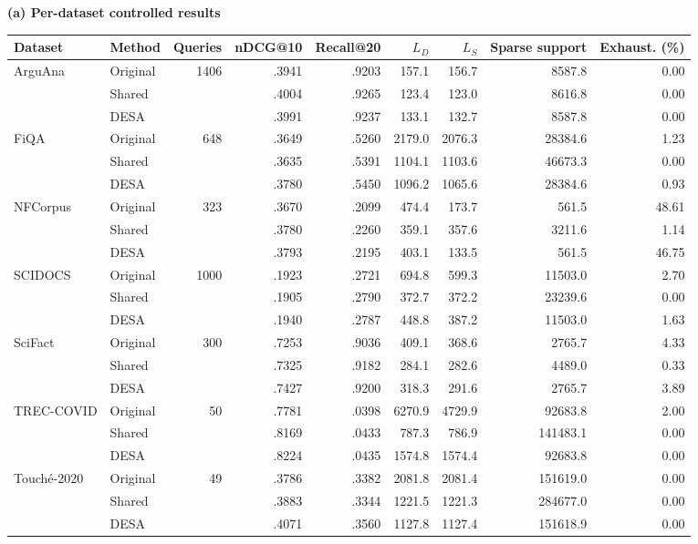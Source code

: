 \begin{table}[!t]
\centering
\footnotesize
\textbf{(a) Per-dataset controlled results}\par\smallskip
\setlength{\tabcolsep}{2.2pt}
\begin{tabular}{llrrrrrrr}
\toprule
Dataset & Method & Queries & nDCG@10 & Recall@20 & $L_D$ & $L_S$ & Sparse support & Exhaust. (\%) \\
\midrule
ArguAna & Original & 1406 & .3941 & .9203 & 157.1 & 156.7 & 8587.8 & 0.00 \\
        & Shared   &      & .4004 & .9265 & 123.4 & 123.0 & 8616.8 & 0.00 \\
        & DESA     &      & .3991 & .9237 & 133.1 & 132.7 & 8587.8 & 0.00 \\
\addlinespace
FiQA & Original & 648 & .3649 & .5260 & 2179.0 & 2076.3 & 28384.6 & 1.23 \\
     & Shared   &     & .3635 & .5391 & 1104.1 & 1103.6 & 46673.3 & 0.00 \\
     & DESA     &     & .3780 & .5450 & 1096.2 & 1065.6 & 28384.6 & 0.93 \\
\addlinespace
NFCorpus & Original & 323 & .3670 & .2099 & 474.4 & 173.7 & 561.5 & 48.61 \\
         & Shared   &     & .3780 & .2260 & 359.1 & 357.6 & 3211.6 & 1.14 \\
         & DESA     &     & .3793 & .2195 & 403.1 & 133.5 & 561.5 & 46.75 \\
\addlinespace
SCIDOCS & Original & 1000 & .1923 & .2721 & 694.8 & 599.3 & 11503.0 & 2.70 \\
        & Shared   &      & .1905 & .2790 & 372.7 & 372.2 & 23239.6 & 0.00 \\
        & DESA     &      & .1940 & .2787 & 448.8 & 387.2 & 11503.0 & 1.63 \\
\addlinespace
SciFact & Original & 300 & .7253 & .9036 & 409.1 & 368.6 & 2765.7 & 4.33 \\
        & Shared   &     & .7325 & .9182 & 284.1 & 282.6 & 4489.0 & 0.33 \\
        & DESA     &     & .7427 & .9200 & 318.3 & 291.6 & 2765.7 & 3.89 \\
\addlinespace
TREC-COVID & Original & 50 & .7781 & .0398 & 6270.9 & 4729.9 & 92683.8 & 2.00 \\
           & Shared   &    & .8169 & .0433 & 787.3 & 786.9 & 141483.1 & 0.00 \\
           & DESA     &    & .8224 & .0435 & 1574.8 & 1574.4 & 92683.8 & 0.00 \\
\addlinespace
Touch\'e-2020 & Original & 49 & .3786 & .3382 & 2081.8 & 2081.4 & 151619.0 & 0.00 \\
              & Shared   &    & .3883 & .3344 & 1221.5 & 1221.3 & 284677.0 & 0.00 \\
              & DESA     &    & .4071 & .3560 & 1127.8 & 1127.4 & 151618.9 & 0.00 \\
\bottomrule
\end{tabular}


\end{table}
